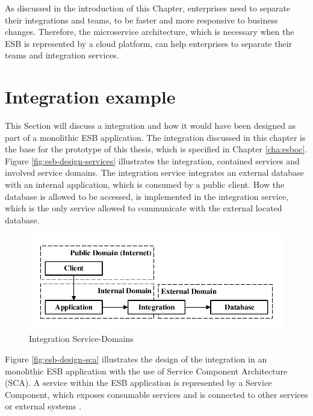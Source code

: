 As discussed in the introduction of this Chapter, enterprises need to separate their integrations and teams, to be faster and more responsive to business changes. Therefore, the microservice architecture, which is necessary when the ESB is represented by a cloud platform, can help enterprises to separate their teams and integration services.

\section{Integration example}
\label{sec:esb-integration-example}
This Section will discuss a integration and how it would have been designed as part of a monolithic ESB application. The integration discussed in this chapter is the base for the prototype of this thesis, which is specified in Chapter \vref{cha:esboc}. Figure \vref{fig:esb-design-services} illustrates the integration, contained services and involved service domains. The integration service integrates an external database with an internal application, which is consumed by a public client. How the database is allowed to be accessed, is implemented in the integration service, which is the only service allowed to communicate with the external located database.

\begin{figure}[htbp]
	\centering
	\includegraphics[scale=1]{images/esb-integration-example.pdf}
	\caption{Integration Service-Domains}
	\label{fig:esb-design-services}
\end{figure}

Figure \vref{fig:esb-design-sca} illustrates the design of the integration in an monolithic ESB application with the use of Service Component Architecture (SCA). A service within the ESB application is represented by a Service Component, which exposes consumable services  and is connected to other services or external systems . 

